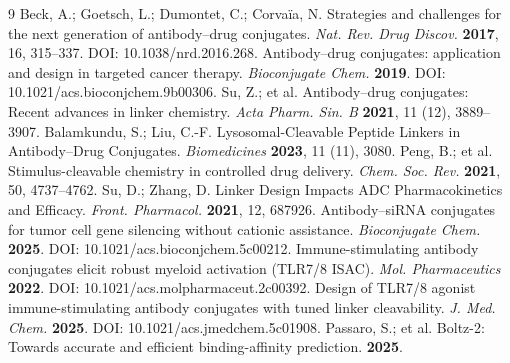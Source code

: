 \documentclass[10pt]{article}
\begin{document}
\begin{thebibliography}{9}
 Beck, A.; Goetsch, L.; Dumontet, C.; Corva\"ia, N. Strategies and challenges for the next generation of antibody--drug conjugates. \emph{Nat. Rev. Drug Discov.} \textbf{2017}, 16, 315--337. DOI: 10.1038/nrd.2016.268.
 Antibody--drug conjugates: application and design in targeted cancer therapy. \emph{Bioconjugate Chem.} \textbf{2019}. DOI: 10.1021/acs.bioconjchem.9b00306.
 Su, Z.; et al. Antibody--drug conjugates: Recent advances in linker chemistry. \emph{Acta Pharm. Sin. B} \textbf{2021}, 11 (12), 3889--3907.
 Balamkundu, S.; Liu, C.-F. Lysosomal-Cleavable Peptide Linkers in Antibody--Drug Conjugates. \emph{Biomedicines} \textbf{2023}, 11 (11), 3080.
 Peng, B.; et al. Stimulus-cleavable chemistry in controlled drug delivery. \emph{Chem. Soc. Rev.} \textbf{2021}, 50, 4737--4762.
 Su, D.; Zhang, D. Linker Design Impacts ADC Pharmacokinetics and Efficacy. \emph{Front. Pharmacol.} \textbf{2021}, 12, 687926.
 Antibody--siRNA conjugates for tumor cell gene silencing without cationic assistance. \emph{Bioconjugate Chem.} \textbf{2025}. DOI: 10.1021/acs.bioconjchem.5c00212.
 Immune-stimulating antibody conjugates elicit robust myeloid activation (TLR7/8 ISAC). \emph{Mol. Pharmaceutics} \textbf{2022}. DOI: 10.1021/acs.molpharmaceut.2c00392.
 Design of TLR7/8 agonist immune-stimulating antibody conjugates with tuned linker cleavability. \emph{J. Med. Chem.} \textbf{2025}. DOI: 10.1021/acs.jmedchem.5c01908.
 Passaro, S.; et al. Boltz-2: Towards accurate and efficient binding-affinity prediction. \textbf{2025}.
\end{thebibliography}
\end{document}
